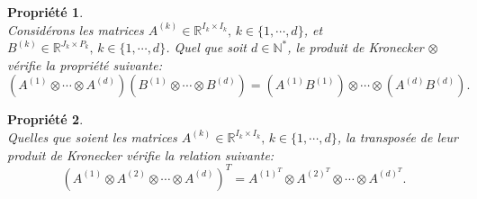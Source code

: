 \documentclass[11pt,a4paper,oneside]{book}
\newtheorem{propp}{Propriété}[chapter]
\def\N{\mathbb N}
\def\R{\mathbb R}
\begin{document}
\begin{propp}\label{propp:2.1}
	\emph{\\}
	Considérons les matrices $ A^{(k)}\in\R^{I_{k}\times I_{k}},\, k\in\{1,\cdots,d\} $, et  $ B^{(k)}\in\R^{J_{k}\times P_{k}},\, k\in\{1,\cdots,d\} $. Quel que soit $ d\in \N^{*} $, le produit de Kronecker $ \otimes $ vérifie la propriété suivante:
	\begin{equation}
	\left(A^{(1)}\otimes\cdots\otimes A^{(d)}\right)\left(B^{(1)}\otimes\cdots\otimes B^{(d)}\right)=\left(A^{(1)}B^{(1)}\right)\otimes\cdots\otimes\left(A^{(d)}B^{(d)}\right).
	\end{equation}
\end{propp}

\begin{propp}\label{propp:2.2}
	\emph{\\}
Quelles que soient les matrices $ A^{(k)}\in\R^{I_{k}\times I_{k}},\,k\in\{1,\cdots,d\} $, la transposée de leur produit de Kronecker vérifie la relation suivante:
	\begin{equation}
	\left(A^{(1)}\otimes A^{(2)}\otimes\cdots\otimes A^{(d)}\right)^{T}=A^{(1)^T}\otimes A^{(2)^T}\otimes\cdots\otimes A^{(d)^T}.
	\end{equation}
\end{propp}
\end{document}

